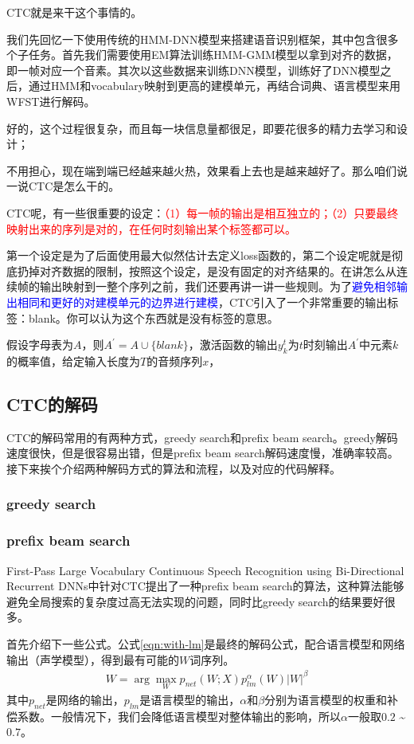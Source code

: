 CTC就是来干这个事情的。

我们先回忆一下使用传统的HMM-DNN模型来搭建语音识别框架，其中包含很多个子任务。首先我们需要使用EM算法训练HMM-GMM模型以拿到对齐的数据，即一帧对应一个音素。其次以这些数据来训练DNN模型，训练好了DNN模型之后，通过HMM和vocabulary映射到更高的建模单元，再结合词典、语言模型来用WFST进行解码。

好的，这个过程很复杂，而且每一块信息量都很足，即要花很多的精力去学习和设计；

不用担心，现在端到端已经越来越火热，效果看上去也是越来越好了。那么咱们说一说CTC是怎么干的。

CTC呢，有一些很重要的设定：\textcolor{red}{（1）每一帧的输出是相互独立的；（2）只要最终映射出来的序列是对的，在任何时刻输出某个标签都可以。}

第一个设定是为了后面使用最大似然估计去定义loss函数的，第二个设定呢就是彻底扔掉对齐数据的限制，按照这个设定，是没有固定的对齐结果的。在讲怎么从连续帧的输出映射到一整个序列之前，我们还要再讲一讲一些规则。为了\textcolor{blue}{避免相邻输出相同和更好的对建模单元的边界进行建模}，CTC引入了一个非常重要的输出标签：blank。你可以认为这个东西就是没有标签的意思。

假设字母表为$A$，则$A^{'}=A\cup\{blank\}$，激活函数的输出$y_k^{t}$为$t$时刻输出$A^{'}$中元素$k$的概率值，给定输入长度为$T$的音频序列$x$，

\subsection{CTC的解码}
CTC的解码常用的有两种方式，greedy search和prefix beam search。greedy解码速度很快，但是很容易出错，但是prefix beam search解码速度慢，准确率较高。接下来挨个介绍两种解码方式的算法和流程，以及对应的代码解释。

\subsubsection{greedy search}


\subsubsection{prefix beam search}
First-Pass Large Vocabulary Continuous Speech Recognition using Bi-Directional Recurrent DNNs中针对CTC提出了一种prefix beam search的算法，这种算法能够避免全局搜索的复杂度过高无法实现的问题，同时比greedy search的结果要好很多。

首先介绍下一些公式。公式\ref{eqn:with-lm}是最终的解码公式，配合语言模型和网络输出（声学模型），得到最有可能的$W$词序列。
\begin{align}
\label{eqn:with-lm}
W = \arg\mathop{\max}_{W}p_{net}(W;X)p_{lm}^{\alpha}(W)|W|^{\beta}
\end{align}
其中$p_{net}$是网络的输出，$p_{lm}$是语言模型的输出，$\alpha$和$\beta$分别为语言模型的权重和补偿系数。一般情况下，我们会降低语言模型对整体输出的影响，所以$\alpha$一般取$0.2$ \~ $0.7$。

